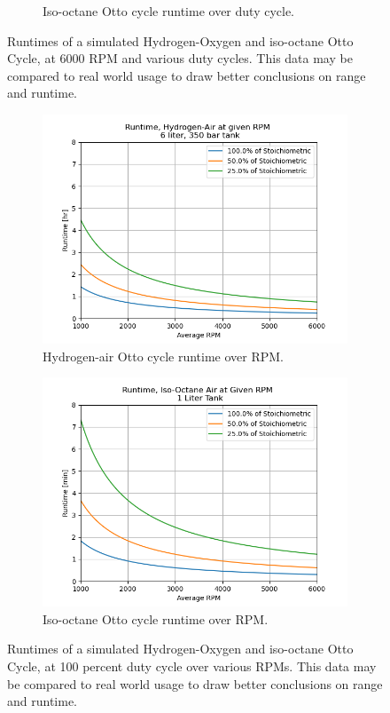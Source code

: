 \documentclass[conf]{new-aiaa}
\begin{document}
\begin{figure}[H]
\begin{subfigure}{0.5\linewidth}
  \caption{Iso-octane Otto cycle runtime over duty cycle.}
  \label{fig:runtime_duty_iso}
\end{subfigure}
\caption{Runtimes of a simulated Hydrogen-Oxygen and iso-octane Otto Cycle, at 6000 RPM and various duty cycles. This data may be compared to real world usage to draw better conclusions on range and runtime.}
\label{fig:runtime_duty}
\end{figure}

\begin{figure}[H]
\centering
\begin{subfigure}{0.5\linewidth}
  \centering
  \includegraphics[width=1\linewidth]{Figures/Hydrogen/runtime_rpm.png}
  \caption{Hydrogen-air Otto cycle runtime over RPM.}
  \label{fig:runtime_rpm_h2}
\end{subfigure}%
\begin{subfigure}{0.5\linewidth}
  \centering
  \includegraphics[width=1\linewidth]{Figures/Iso-octane/runtime_rpm.png}
  \caption{Iso-octane Otto cycle runtime over RPM.}
  \label{fig:runtime_rpm_iso}
\end{subfigure}
\caption{Runtimes of a simulated Hydrogen-Oxygen and iso-octane Otto Cycle, at 100 percent duty cycle over various RPMs. This data may be compared to real world usage to draw better conclusions on range and runtime.}
\label{fig:runtime_rpm}
\end{figure}
\end{document}
